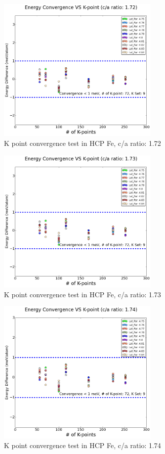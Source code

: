 \documentclass{article}
\begin{document}
\begin{description}
\begin{figure}[h!]
\centering
\includegraphics[width=0.7\textwidth]{Q1_HCP_K_Point_172_test.png}
\caption{K point convergence test in HCP Fe, c/a ratio: 1.72}
\label{fig:HCP_1.72}
\end{figure} 

\begin{figure}[h!]
\centering
\includegraphics[width=0.7\textwidth]{Q1_HCP_K_Point_173_test.png}
\caption{K point convergence test in HCP Fe, c/a ratio: 1.73}
\label{fig:HCP_1.73}
\end{figure} 

\begin{figure}[h!]
\centering
\includegraphics[width=0.7\textwidth]{Q1_HCP_K_Point_174_test.png}
\caption{K point convergence test in HCP Fe, c/a ratio: 1.74}
\label{fig:HCP_1.74}
\end{figure}


\end{description}
\end{document}
